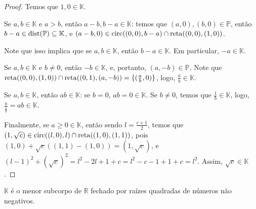 \begin{proof}
    Temos que $1, 0 \in \mathbb K$.

    Se $a, b \in \mathbb K$ e $a>b$, então $a-b, b-a \in \mathbb K$: temos que $(a, 0), (b, 0) \in \mathbb P$, então $b-a \in \operatorname{dist}(\mathbb P)\subseteq \mathbb K$, e $(a-b, 0) \in \operatorname{circ}((0, 0), b-a)\cap \operatorname{reta}((0, 0), (1, 0))$.

    Note que isso implica que se $a, b \in \mathbb K$, então $b-a\in \mathbb K$. Em particular, $-a \in \mathbb K$.

    Se $a, b \in \mathbb K$ e $b\neq 0$, então $-b \in \mathbb K$, e, portanto, $(a, -b)\in \mathbb P$. Note que $\operatorname{reta}((0, 0), (1, 0))\cap \operatorname{reta}((0, 1), (a, -b))=\{(\frac ab, 0)\}$, logo, $\frac ab \in \mathbb K$.

    Se $a, b \in \mathbb K$, então $ab \in \mathbb K$: se $b=0$, $ab=0\in \mathbb K$. Se $b\neq 0$, temos que $\frac 1b\in \mathbb K$, logo, $\frac{a}{\frac1b}=ab\in \mathbb K$.

    Finalmente, se $a\geq 0  \in \mathbb K$, então sendo $l=\frac{c+1}{2}$, temos que $(1, \sqrt c)\in \operatorname{circ}((l, 0), l)\cap \operatorname{reta}((1, 0), (1, 1))$, pois $(1, 0)+\sqrt c((1, 1)-(1, 0))=(1, \sqrt c)$, e $(l-1)^2+(\sqrt c)^2=l^2-2l+1+c=l^2-c-1+1+c=l^2$. Assim, $\sqrt c \in \mathbb K$.
\end{proof}
\begin{prop}
    $\mathbb K$ é o menor subcorpo de $\mathbb R$ fechado por raízes quadradas de números não negativos.
\end{prop}

